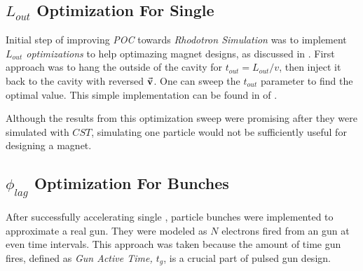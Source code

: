 \documentclass{book}
\begin{document}
\subsection{$L_{out}$ Optimization For Single \e} \label{sec:lout_sweep}
Initial step of improving \textit{POC} towards \textit{Rhodotron Simulation} was to implement \textit{$L_{out}$ optimizations} to help optimazing magnet designs, as discussed in .
First approach was to hang the \e outside of the cavity for $t_{out} = L_{out}/v$, then inject it back to the cavity with reversed $\vec{\textbf{v}}$. One can sweep the $t_{out}$ parameter to find the optimal value.
This simple implementation can be found in  of .

Although the results from this optimization sweep were promising after they were simulated with $CST$, simulating one particle would not be sufficiently useful for designing a magnet.

\subsection{$\phi_{lag}$ Optimization For Bunches} \label{sec:philag_sweep}
After successfully accelerating single \e, particle bunches were implemented to approximate a real \e gun. 
They were modeled as $N$ electrons fired from an \e gun at even time intervals. This approach was taken because the amount of time gun fires, defined as \textit{Gun Active Time, $t_g$}, is a crucial part of pulsed \e gun design.
\end{document}
